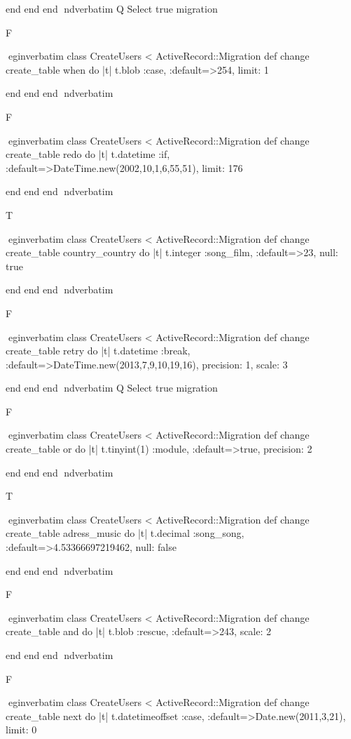     end 
  end 
end
nd{verbatim}
Q
 Select true migration

F

egin{verbatim}
 class CreateUsers < ActiveRecord::Migration 
  def change 
    create_table when do |t| 
      t.blob :case, :default=>254, limit: 1
    
    end 
  end 
end
nd{verbatim}

F

egin{verbatim}
 class CreateUsers < ActiveRecord::Migration 
  def change 
    create_table redo do |t| 
      t.datetime :if, :default=>DateTime.new(2002,10,1,6,55,51), limit: 176
    
    end 
  end 
end
nd{verbatim}

T

egin{verbatim}
 class CreateUsers < ActiveRecord::Migration 
  def change 
    create_table country_country do |t| 
      t.integer :song_film, :default=>23, null: true
    
    end 
  end 
end
nd{verbatim}

F

egin{verbatim}
 class CreateUsers < ActiveRecord::Migration 
  def change 
    create_table retry do |t| 
      t.datetime :break, :default=>DateTime.new(2013,7,9,10,19,16), precision: 1, scale: 3
    
    end 
  end 
end
nd{verbatim}
Q
 Select true migration

F

egin{verbatim}
 class CreateUsers < ActiveRecord::Migration 
  def change 
    create_table or do |t| 
      t.tinyint(1) :module, :default=>true, precision: 2
    
    end 
  end 
end
nd{verbatim}

T

egin{verbatim}
 class CreateUsers < ActiveRecord::Migration 
  def change 
    create_table adress_music do |t| 
      t.decimal :song_song, :default=>4.53366697219462, null: false
    
    end 
  end 
end
nd{verbatim}

F

egin{verbatim}
 class CreateUsers < ActiveRecord::Migration 
  def change 
    create_table and do |t| 
      t.blob :rescue, :default=>243, scale: 2
    
    end 
  end 
end
nd{verbatim}

F

egin{verbatim}
 class CreateUsers < ActiveRecord::Migration 
  def change 
    create_table next do |t| 
      t.datetimeoffset :case, :default=>Date.new(2011,3,21), limit: 0
    
